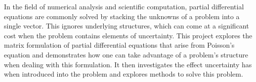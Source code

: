 In the field of numerical analysis and scientific computation, partial differential equations are commonly solved by stacking the unknowns of a problem into a single vector. This ignores underlying structures, which can come at a significant cost when the problem contains elements of uncertainty. This project explores the matrix formulation of partial differential equations that arise from Poisson's equation and demonstrates how one can take advantage of a problem's structure when dealing with this formulation. It then investigates the effect uncertainty has when introduced into the problem and explores methods to solve this problem. 